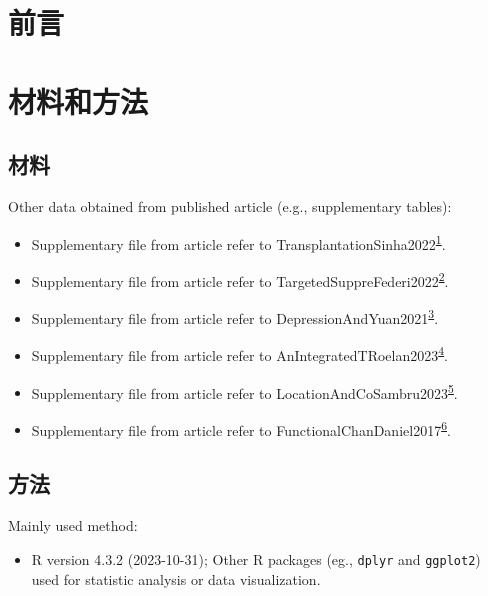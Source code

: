 \documentclass[
]{article}
\providecommand{\tightlist}{%
  \setlength{\itemsep}{0pt}\setlength{\parskip}{0pt}}
\begin{document}
\hypertarget{introduction}{%
\section{前言}\label{introduction}}

\hypertarget{methods}{%
\section{材料和方法}\label{methods}}

\hypertarget{ux6750ux6599}{%
\subsection{材料}\label{ux6750ux6599}}

Other data obtained from published article (e.g., supplementary tables):

\begin{itemize}
\tightlist
\item
  Supplementary file from article refer to TransplantationSinha2022\textsuperscript{\protect\hyperlink{ref-TransplantationSinha2022}{1}}.
\item
  Supplementary file from article refer to TargetedSuppreFederi2022\textsuperscript{\protect\hyperlink{ref-TargetedSuppreFederi2022}{2}}.
\item
  Supplementary file from article refer to DepressionAndYuan2021\textsuperscript{\protect\hyperlink{ref-DepressionAndYuan2021}{3}}.
\item
  Supplementary file from article refer to AnIntegratedTRoelan2023\textsuperscript{\protect\hyperlink{ref-AnIntegratedTRoelan2023}{4}}.
\item
  Supplementary file from article refer to LocationAndCoSambru2023\textsuperscript{\protect\hyperlink{ref-LocationAndCoSambru2023}{5}}.
\item
  Supplementary file from article refer to FunctionalChanDaniel2017\textsuperscript{\protect\hyperlink{ref-FunctionalChanDaniel2017}{6}}.
\end{itemize}

\hypertarget{ux65b9ux6cd5}{%
\subsection{方法}\label{ux65b9ux6cd5}}

Mainly used method:

\begin{itemize}
\tightlist
\item
  R version 4.3.2 (2023-10-31); Other R packages (eg., \texttt{dplyr} and \texttt{ggplot2}) used for statistic analysis or data visualization.
\end{itemize}
\end{document}
